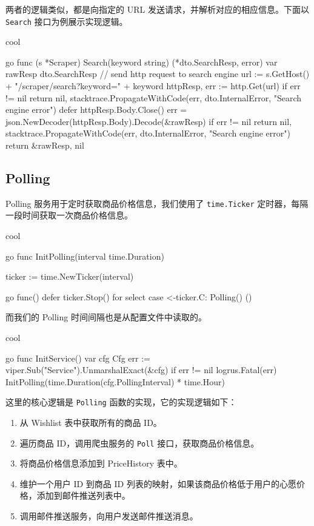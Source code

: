 两者的逻辑类似，都是向指定的 URL 发送请求，并解析对应的相应信息。下面以 \texttt{Search} 接口为例展示实现逻辑。

\begin{codebox}{}{cool}
\begin{amzcode}{go}
func (s *Scraper) Search(keyword string) (*dto.SearchResp, error) {
	var rawResp dto.SearchResp
	// send http request to search engine
	url := s.GetHost() + "/scraper/search?keyword=" + keyword
	httpResp, err := http.Get(url)
	if err != nil {
		return nil, stacktrace.PropagateWithCode(err, dto.InternalError, "Search engine error")
	}
	defer httpResp.Body.Close()
	err = json.NewDecoder(httpResp.Body).Decode(&rawResp)
	if err != nil {
		return nil, stacktrace.PropagateWithCode(err, dto.InternalError, "Search engine error")
	}
	return &rawResp, nil
}
\end{amzcode}
\end{codebox}

\subsection{Polling}

Polling 服务用于定时获取商品价格信息，我们使用了 \texttt{time.Ticker} 定时器，每隔一段时间获取一次商品价格信息。

\begin{codebox}{}{cool}
\begin{amzcode}{go}
func InitPolling(interval time.Duration) {
	ticker := time.NewTicker(interval)

	go func() {
		defer ticker.Stop()
		for {
			select {
			case <-ticker.C:
				Polling()
			}
		}
	}()
}
\end{amzcode}
\end{codebox}

而我们的 Polling 时间间隔也是从配置文件中读取的。

\begin{codebox}{}{cool}
\begin{amzcode}{go}
func InitService() {
	var cfg Cfg
	err := viper.Sub("Service").UnmarshalExact(&cfg)
	if err != nil {
		logrus.Fatal(err)
	}
	InitPolling(time.Duration(cfg.PollingInterval) * time.Hour)
}
\end{amzcode}
\end{codebox}

这里的核心逻辑是 \texttt{Polling} 函数的实现，它的实现逻辑如下：

\begin{enumerate}
  \item 从 Wishlist 表中获取所有的商品 ID。
  \item 遍历商品 ID，调用爬虫服务的 \texttt{Poll} 接口，获取商品价格信息。
  \item 将商品价格信息添加到 PriceHistory 表中。
  \item 维护一个用户 ID 到商品 ID 列表的映射，如果该商品价格低于用户的心愿价格，添加到邮件推送列表中。
  \item 调用邮件推送服务，向用户发送邮件推送消息。
\end{enumerate}

